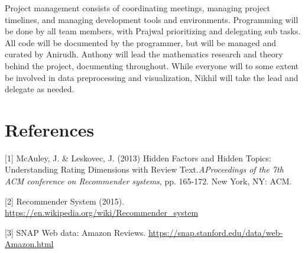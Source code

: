 \documentclass{article} %
\begin{document}
Project management consists of coordinating meetings, managing project timelines, and managing development tools and environments. Programming will be done by all team members, with Prajwal prioritizing and delegating sub tasks. All code will be documented by the programmer, but will be managed and curated by Anirudh. Anthony will lead the mathematics research and theory behind the project, documenting throughout. While everyone will to some extent be involved in data preprocessing and visualization, Nikhil will take the lead and delegate as needed. 

\section*{References}

\small{
[1] McAuley, J. \& Leskovec, J. (2013) Hidden Factors and Hidden Topics: Understanding Rating Dimensions with Review Text.{\it AProceedings of the 7th ACM conference on Recommender systems}, pp. 165-172. New York, NY: ACM.

[2] Recommender System (2015). \url{https://en.wikipedia.org/wiki/Recommender_system}

[3] SNAP Web data: Amazon Reviews. \url{https://snap.stanford.edu/data/web-Amazon.html}
}
\end{document}
